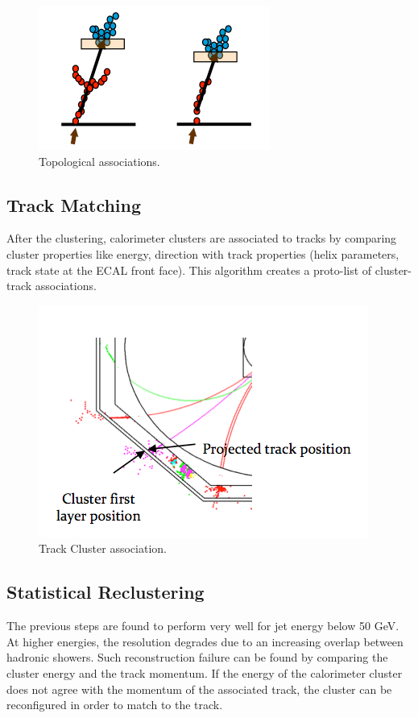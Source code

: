\documentclass[a4paper,12pt]{article}
\begin{document}
\begin{figure}[!h]
   \centering
   \includegraphics[scale=0.5]{topo_cluster.png} 
      \caption{Topological associations.}
   \label{fig:topo}
\end{figure}

\subsection{Track Matching}

After the clustering, calorimeter clusters are associated to tracks by comparing cluster properties like energy, direction with track properties (helix parameters, track state at the ECAL front face). This algorithm creates a proto-list of cluster-track associations. 

\begin{figure}[!h]
   \centering
   \includegraphics[scale=0.5]{track_cluster_asso.png} 
      \caption{Track Cluster association.}
   \label{fig:track_cluster_asso}
\end{figure}

\subsection{Statistical Reclustering}

The previous steps are found to perform very well for jet energy below 50 GeV. At higher energies, the resolution degrades due to an increasing overlap between hadronic showers. Such reconstruction failure can be found by comparing the cluster energy and the track momentum. 
If the energy of the calorimeter cluster does not agree with the momentum of the associated track, the cluster can be reconfigured in order to match to the track. 
\end{document}
